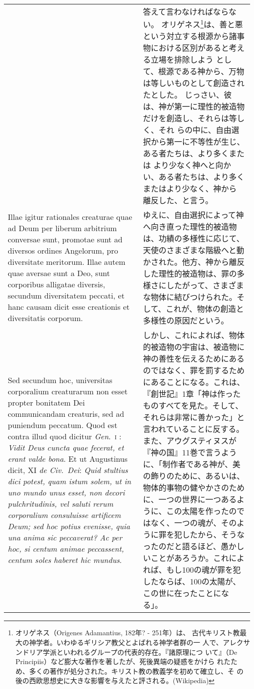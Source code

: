 \documentclass[10pt]{jsarticle} %
\begin{document}
\begin{longtable}{p{21em}p{21em}}
&

答えて言わなければならない。
オリゲネス\footnote{オリゲネス（Origenes Adamantius, 182年? - 251年）は、
 古代キリスト教最大の神学者。いわゆるギリシア教父とよばれる神学者群の一
 人で、アレクサンドリア学派といわれるグループの代表的存在。『諸原理につ
 いて』（De Principiis）など膨大な著作を著したが、死後異端の疑惑をかけら
 れたため、多くの著作が処分された。キリスト教の教義学を初めて確立し、そ
 の後の西欧思想史に大きな影響を与えたと評される。(Wikipedia)}は、善と悪
 という対立する根源から諸事物における区別があると考える立場を排除しよう
 として、根源である神から、万物は等しいものとして創造されたとした。
じっさい、彼は、神が第一に理性的被造物だけを創造し、それらは等しく、それ
 らの中に、自由選択から第一に不等性が生じ、ある者たちは、より多くまたは
 より少なく神へと向かい、ある者たちは、より多くまたはより少なく、神から
 離反した、と言う。

\\

Illae igitur
rationales creaturae quae ad Deum per liberum arbitrium conversae sunt,
promotae sunt ad diversos ordines Angelorum, pro diversitate
meritorum. Illae autem quae aversae sunt a Deo, sunt corporibus
alligatae diversis, secundum diversitatem peccati, et hanc causam dicit
esse creationis et diversitatis corporum. 

&
ゆえに、自由選択によって神へ向き直った理性的被造物は、功績の多様性に応じて、天使のさまざまな階級へと動かされた。他方、神から離反した理性的被造物は、罪の多様さにしたがって、さまざまな物体に結びつけられた。そして、これが、物体の創造と多様性の原因だという。

\\

Sed secundum hoc, universitas corporalium creaturarum non esset propter
bonitatem Dei communicandam creaturis, sed ad puniendum peccatum. Quod
est contra illud quod dicitur {\itshape Gen}.~{\scshape i} : {\itshape
Vidit Deus cuncta quae fecerat, et erant valde bona}. Et ut Augustinus
dicit, XI {\itshape de Civ.~Dei}: {\itshape Quid stultius dici potest,
quam istum solem, ut in uno mundo unus esset, non decori pulchritudinis,
vel saluti rerum corporalium consuluisse artificem Deum; sed hoc potius
evenisse, quia una anima sic peccaverat? Ac per hoc, si centum animae
peccassent, centum soles haberet hic mundus}.

&
しかし、これによれば、物体的被造物の宇宙は、被造物に神の善性を伝えるためにあるのではなく、罪を罰するためにあることになる。これは、『創世記』1章「神は作ったものすべてを見た。そして、それらは非常に善かった」と言われていることに反する。また、アウグスティヌスが『神の国』11巻で言うように、「制作者である神が、美の飾りのために、あるいは、物体的事物の健やかさのために、一つの世界に一つあるように、この太陽を作ったのではなく、一つの魂が、そのように罪を犯したから、そうなったのだと語るほど、愚かしいことがあろうか。これによれば、もし100の魂が罪を犯したならば、100の太陽が、この世に在ったことになる」。


\end{longtable}
\end{document}
